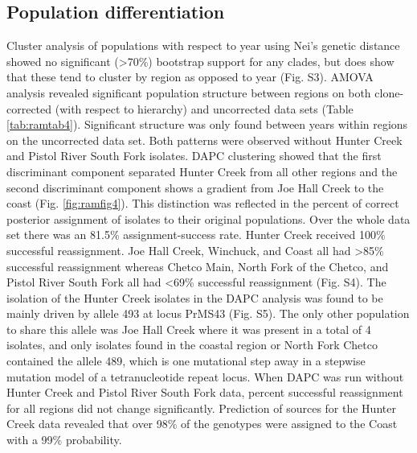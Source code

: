\documentclass[double,12pt]{beavtex}
\begin{document}
  \subsection{Population
  differentiation}\label{population-differentiation}
  
  Cluster analysis of populations with respect to year using Nei's genetic
  distance showed no significant (\textgreater{}70\%) bootstrap support
  for any clades, but does show that these tend to cluster by region as
  opposed to year (Fig. S3). AMOVA analysis revealed significant
  population structure between regions on both clone-corrected (with
  respect to hierarchy) and uncorrected data sets (Table
  \ref{tab:ramtab4}). Significant structure was only found between years
  within regions on the uncorrected data set. Both patterns were observed
  without Hunter Creek and Pistol River South Fork isolates. DAPC
  clustering showed that the first discriminant component separated Hunter
  Creek from all other regions and the second discriminant component shows
  a gradient from Joe Hall Creek to the coast (Fig. \ref{fig:ramfig4}).
  This distinction was reflected in the percent of correct posterior
  assignment of isolates to their original populations. Over the whole
  data set there was an 81.5\% assignment-success rate. Hunter Creek
  received 100\% successful reassignment. Joe Hall Creek, Winchuck, and
  Coast all had \textgreater{}85\% successful reassignment whereas Chetco
  Main, North Fork of the Chetco, and Pistol River South Fork all had
  \textless{}69\% successful reassignment (Fig. S4). The isolation of the
  Hunter Creek isolates in the DAPC analysis was found to be mainly driven
  by allele 493 at locus PrMS43 (Fig. S5). The only other population to
  share this allele was Joe Hall Creek where it was present in a total of
  4 isolates, and only isolates found in the coastal region or North Fork
  Chetco contained the allele 489, which is one mutational step away in a
  stepwise mutation model of a tetranucleotide repeat locus. When DAPC was
  run without Hunter Creek and Pistol River South Fork data, percent
  successful reassignment for all regions did not change significantly.
  Prediction of sources for the Hunter Creek data revealed that over 98\%
  of the genotypes were assigned to the Coast with a 99\% probability.
  
\end{document}

